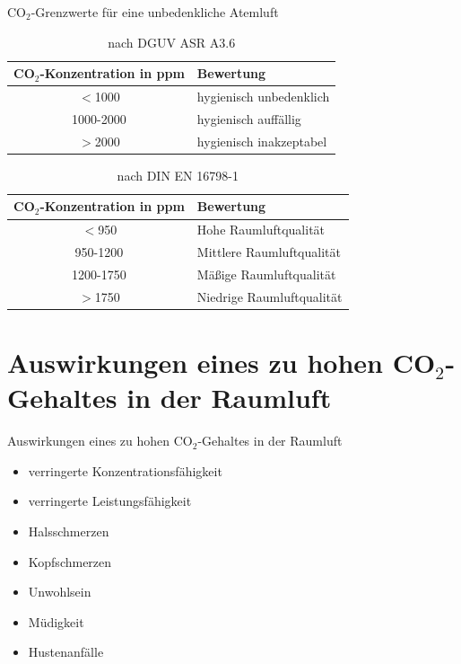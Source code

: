 \documentclass[10pt,ngerman]{beamer}
\begin{document}
\begin{frame}[fragile]{CO$_2$-Grenzwerte für eine unbedenkliche Atemluft}
  \begin{table}
  \begin{tabular}{ |c|p{}|}
    \hline
    CO$_2$-Konzentration in ppm & Bewertung \\ \hline
    $<$1000                          & hygienisch unbedenklich \\ \hline
    1000-2000                        & hygienisch auffällig \\ \hline
    $>$2000                         & hygienisch inakzeptabel\\ \hline
  \end{tabular}
  \caption{nach DGUV ASR A3.6}
\end{table}
  \begin{table}
  \begin{tabular}{|c|p{}|}
    \hline
    CO$_2$-Konzentration in ppm & Bewertung \\ \hline
    $<$950                          &  Hohe Raumluftqualität \\ \hline
    950-1200                        &  Mittlere Raumluftqualität \\ \hline
    1200-1750                        & Mäßige Raumluftqualität \\ \hline
    $>$1750                          & Niedrige Raumluftqualität\\ \hline
  \end{tabular}
  \caption{nach DIN EN 16798-1}
\end{table}
\end{frame}

\section{Auswirkungen eines zu hohen CO$_2$-Gehaltes in der Raumluft}
\begin{frame}[fragile]{Auswirkungen eines zu hohen CO$_2$-Gehaltes in der Raumluft}
  \begin{itemize}
      \item verringerte Konzentrationsfähigkeit
      \item verringerte Leistungsfähigkeit
      \item Halsschmerzen
      \item Kopfschmerzen
      \item Unwohlsein
      \item Müdigkeit
      \item Hustenanfälle
  \end{itemize}
\end{frame}
  
\end{document}
